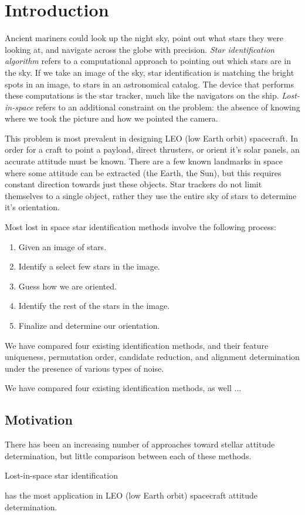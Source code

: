 \section{Introduction}
Ancient mariners could look up the night sky, point out what stars they were looking at, and navigate across the globe with precision. \textit{Star identification algorithm} refers to a computational approach to pointing out which stars are in the sky. If we take an image of the sky, star identification is matching the bright spots in an image, to stars in an astronomical catalog. The device that performs these computations is the star tracker, much like the navigators on the ship. \textit{Lost-in-space} refers to an additional constraint on the problem: the absence of knowing where we took the picture and how we pointed the camera.

This problem is most prevalent in designing  LEO (low Earth orbit) spacecraft. In order for a craft to point a payload, direct thrusters, or orient it's solar panels, an accurate attitude must be known. There are a few known landmarks in space where some attitude can be extracted (the Earth, the Sun), but this requires constant direction towards just these objects. Star trackers do not limit themselves to a single object, rather they use the entire sky of stars to determine it's orientation. 

Most lost in space star identification methods involve the following process:
\begin{enumerate}
\item Given an image of stars.
\item Identify a select few stars in the image.
\item Guess how we are oriented.
\item Identify the rest of the stars in the image.
\item Finalize and determine our orientation.
\end{enumerate}

We have compared four existing identification methods, and their feature uniqueness, permutation order, candidate reduction, and alignment determination under the presence of various types of noise. 

We have compared four existing identification methods, as well ...

\subsection{Motivation}
There has been an increasing number of approaches toward stellar attitude determination, but little comparison between each of these methods. 



Lost-in-space star identification 

has the most application in LEO (low Earth orbit) spacecraft attitude determination. 



